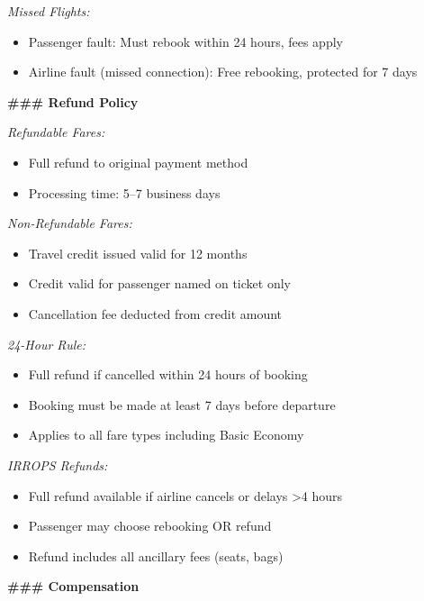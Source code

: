 \begin{tcolorbox}[promptbox, title={\small \texttt{Airline CSM Agent Prompt}}]
\medskip
\textit{Missed Flights:}
\begin{itemize}
  \item Passenger fault: Must rebook within 24 hours, fees apply
  \item Airline fault (missed connection): Free rebooking, protected for 7 days
\end{itemize}
 
\bigskip
\textbf{\#\#\# Refund Policy}
 
\medskip
\textit{Refundable Fares:}
\begin{itemize}
  \item Full refund to original payment method
  \item Processing time: 5--7 business days
\end{itemize}
 
\medskip
\textit{Non-Refundable Fares:}
\begin{itemize}
  \item Travel credit issued valid for 12 months
  \item Credit valid for passenger named on ticket only
  \item Cancellation fee deducted from credit amount
\end{itemize}
 
\medskip
\textit{24-Hour Rule:}
\begin{itemize}
  \item Full refund if cancelled within 24 hours of booking
  \item Booking must be made at least 7 days before departure
  \item Applies to all fare types including Basic Economy
\end{itemize}
 
\medskip
\textit{IRROPS Refunds:}
\begin{itemize}
  \item Full refund available if airline cancels or delays \textgreater4 hours
  \item Passenger may choose rebooking OR refund
  \item Refund includes all ancillary fees (seats, bags)
\end{itemize}
 
\bigskip
\textbf{\#\#\# Compensation}
 

\end{tcolorbox}
